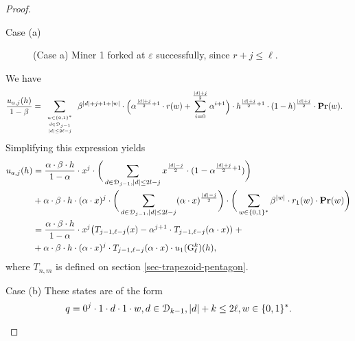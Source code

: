 \begin{proof}
\begin{subsubsection}{Case (a)}
\begin{figure}[ht!]
\caption{(Case a) Miner 1 forked at $\varepsilon$ successfully, since $r+j \leq \ell$.}
\end{figure}


We have
\begin{align*}
    \scriptsize    \frac{u_{a,j}(h)}{1-\beta} &\scriptsize =\sum_{\begin{array}{c}\scriptscriptstyle w\in \{0,1\}^\ast\\ \scriptscriptstyle d\in \mathcal{D}_{j-1}\\ \scriptscriptstyle |d| \leq 2\ell-j\end{array}}\beta^{|d|+j+1+|w|}\cdot \bigg(\alpha^{\frac{|d|+j}{2}+1} \cdot r(w)+\sum_{i=0}^{\frac{|d|+j}{2}}\alpha^{i+1} \bigg)\cdot h^{\frac{|d|+j}{2}+ 1}\cdot (1-h)^{\frac{|d|+j}{2}}\cdot \mathbf{Pr}(w).
\end{align*}
Simplifying this expression yields
\begin{align*}
u_{a,j}(h) &= 
\frac{\alpha\cdot\beta\cdot h}{1-\alpha}\cdot x^j \cdot 
\bigg(\sum_{d\in \mathcal{D}_{j-1}, |d|\leq 2l - j}x^{\frac{|d|-j}{2}}\cdot (1-\alpha^{\frac{|d|+j}{2}+1})\bigg)\\
& 
+\alpha\cdot\beta\cdot h \cdot(\alpha\cdot x)^j\cdot \bigg(\sum_{d\in \mathcal{D}_{j-1}, |d|\leq 2l - j} (\alpha\cdot x)^{\frac{|d|-j}{2}}\bigg)\cdot\bigg(\sum_{w\in\{0,1\}^\ast} \beta^{|w|}\cdot r_1(w)\cdot \mathbf{Pr}(w)\bigg)\\
    &= \frac{\alpha\cdot\beta\cdot h}{1-\alpha}\cdot x^j\big(T_{j-1,\ell-j}(x)-\alpha^{j+1}\cdot T_{j-1,\ell-j}(\alpha\cdot x)) \;+\\
    &+ \alpha\cdot\beta\cdot h\cdot(\alpha \cdot x)^j\cdot T_{j-1,\ell-j}(\alpha\cdot x)\cdot u_1({\rm {G}}^k_\ell)(h),
\end{align*}
where $T_{n,m}$ is defined on section \ref{sec-trapezoid-pentagon}.

\end{subsubsection}

\begin{subsubsection}{Case (b)}
These states are of the form 
$$q = 0^j\cdot 1\cdot d\cdot 1\cdot w, d\in \mathcal{D}_{k-1}, |d|+k \leq 2\ell, w\in \{0,1\}^\ast.$$ 


\end{subsubsection}
\end{proof}
